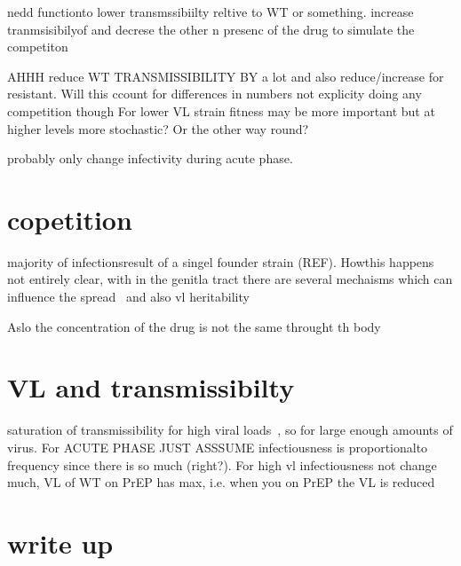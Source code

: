 \documentclass[DIV=15]{scrartcl}
\begin{document}
nedd functionto lower transmssibiilty reltive to WT or  something. increase tranmsisibilyof and decrese the other n presenc of  the drug to  simulate the competiton 

AHHH
reduce WT TRANSMISSIBILITY BY  a lot  and also reduce/increase for resistant. Will this ccount for differences in numbers not explicity doing any competition though
For  lower VL strain fitness may be more important but at higher levels more stochastic? Or the other way round?
 
 probably only change infectivity during acute phase.
 


\section{copetition}
 majority of infectionsresult of a singel founder strain (REF). Howthis happens not entirely clear, with in the genitla tract there are several mechaisms which can influence the spread~\cite{joseph2015} and also vl heritability~\cite{fraser2014}
 
 Aslo the concentration of the drug is not the same throught th body~\cite{patterson2011}
 
 
 \section*{VL and transmissibilty}
 
saturation of transmissibility for high viral loads~\cite{fraser2007}, so for large enough amounts of virus. For  ACUTE PHASE JUST ASSSUME  	infectiousness  is  proportionalto frequency since there is  so much (right?). For  high vl infectiousness not change much, VL of WT on PrEP has max, i.e. when you on PrEP the VL is reduced 
 
 
 
 \section*{write up}
 
\end{document}
